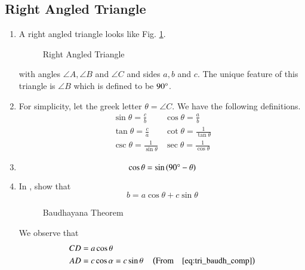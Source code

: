 %
\subsection{Right Angled Triangle}
\begin{enumerate}[label=\thesubsection.\arabic*.,ref=\thesubsection.\theenumi]
%
	\item 
A right angled triangle looks like Fig. \ref{fig:tri_right_angle}.
\begin{figure}[!ht]
\centering
\resizebox{0.6\columnwidth}{!}{}
\caption{Right Angled Triangle}
\label{fig:tri_right_angle}	
\end{figure}
with angles $\angle A,\angle B$ and $\angle C$ and sides $a, b$ and $c$.  The unique feature of this triangle is $\angle B$ which is defined to be $90\degree$.
\item
	For simplicity, let the greek letter $\theta = \angle C$.  We have the following definitions.
\begin{equation}
\label{eq:tri_trig_defs}
\begin{matrix}
	\sin \theta = \frac{c}{b} & 	\cos \theta = \frac{a}{b} \\[1ex]
	\tan \theta = \frac{c}{a} & \cot \theta = \frac{1}{\tan \theta} \\[1ex]
	\csc \theta = \frac{1}{\sin \theta} & \sec \theta = \frac{1}{\cos \theta}
	\end{matrix}
\end{equation}
\item  
	\begin{equation}
	\cos \theta = \sin \left(90\degree - \theta\right)
	\label{eq:tri_baudh_comp}	
	\end{equation}
\item
In  , 
show that 
%
\begin{equation}
\label{ch1_budh_basic}
b = a \cos \theta + c \sin \theta
\end{equation}
%
\begin{figure}[!ht]
	\begin{center}
		\resizebox{0.6\columnwidth}{!}{}
	\end{center}
	\caption{Baudhayana Theorem}
	\label{fig:tri_baudh}	
\end{figure}
\solution We observe that
%
\begin{align}
CD &= a \cos \theta \\
AD &= c \cos\alpha = c \sin \theta \quad \left(\text{From} \quad 
	\eqref{eq:tri_baudh_comp}	
\right)
\end{align}
\end{enumerate}
